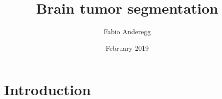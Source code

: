 \documentclass{article}
\title{Brain tumor segmentation}
\author{Fabio Anderegg }
\date{February 2019}
\begin{document}
\maketitle

\section{Introduction}
\end{document}

